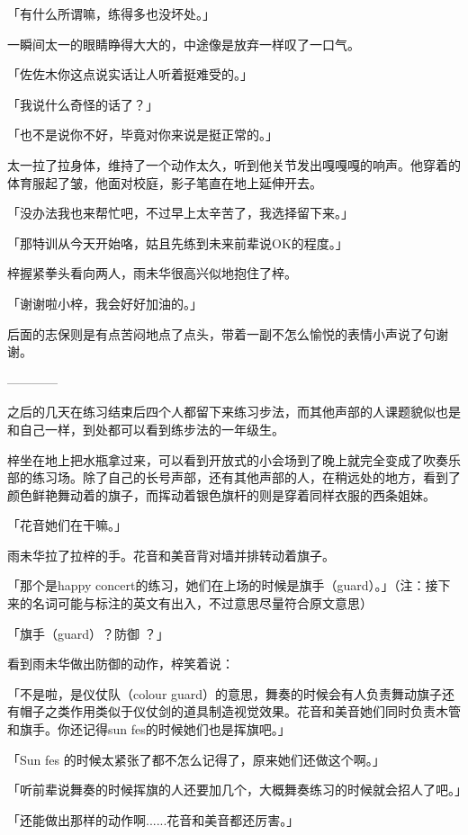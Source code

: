 \documentclass[UTF8]{ctexart}
\begin{document}
    「有什么所谓嘛，练得多也没坏处。」

    一瞬间太一的眼睛睁得大大的，中途像是放弃一样叹了一口气。

    「佐佐木你这点说实话让人听着挺难受的。」

    「我说什么奇怪的话了？」

    「也不是说你不好，毕竟对你来说是挺正常的。」

    太一拉了拉身体，维持了一个动作太久，听到他关节发出嘎嘎嘎的响声。他穿着的体育服起了皱，他面对校庭，影子笔直在地上延伸开去。

    「没办法我也来帮忙吧，不过早上太辛苦了，我选择留下来。」

    「那特训从今天开始咯，姑且先练到未来前辈说OK的程度。」

    梓握紧拳头看向两人，雨未华很高兴似地抱住了梓。

    「谢谢啦小梓，我会好好加油的。」

    后面的志保则是有点苦闷地点了点头，带着一副不怎么愉悦的表情小声说了句谢谢。

    ————

    之后的几天在练习结束后四个人都留下来练习步法，而其他声部的人课题貌似也是和自己一样，到处都可以看到练步法的一年级生。

    梓坐在地上把水瓶拿过来，可以看到开放式的小会场到了晚上就完全变成了吹奏乐部的练习场。除了自己的长号声部，还有其他声部的人，在稍远处的地方，看到了颜色鲜艳舞动着的旗子，而挥动着银色旗杆的则是穿着同样衣服的西条姐妹。

    「花音她们在干嘛。」

    雨未华拉了拉梓的手。花音和美音背对墙并排转动着旗子。

    「那个是happy concert的练习，她们在上场的时候是旗手（guard）。」（注：接下来的名词可能与标注的英文有出入，不过意思尽量符合原文意思）

    「旗手（guard）？防御 ？」

    看到雨未华做出防御的动作，梓笑着说：

    「不是啦，是仪仗队（colour guard）的意思，舞奏的时候会有人负责舞动旗子还有帽子之类作用类似于仪仗剑的道具制造视觉效果。花音和美音她们同时负责木管和旗手。你还记得sun fes的时候她们也是挥旗吧。」

    「Sun fes 的时候太紧张了都不怎么记得了，原来她们还做这个啊。」

    「听前辈说舞奏的时候挥旗的人还要加几个，大概舞奏练习的时候就会招人了吧。」

    「还能做出那样的动作啊......花音和美音都还厉害。」
\end{document}

